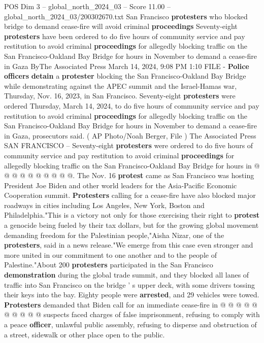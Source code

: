 \begin{textsample}{POS Dim 3 – global\_north\_2024\_03 – Score 11.00 – global\_north\_2024\_03/200302670.txt}  \label{ex:f3_pos_292}
San Francisco \textbf{protesters} who blocked bridge to demand cease-fire will avoid criminal \textbf{proceedings} Seventy-eight \textbf{protesters} have been ordered to do five hours of community service and pay restitution to avoid criminal \textbf{proceedings} for allegedly blocking traffic on the San Francisco-Oakland Bay Bridge for hours in November to demand a cease-fire in Gaza ByThe Associated Press March 14, 2024, 9:08 PM 1:10 FILE - \textbf{Police} \textbf{officers} \textbf{detain} a \textbf{protester} blocking the San Francisco-Oakland Bay Bridge while demonstrating against the APEC summit and the Israel-Hamas war, Thursday, Nov. 16, 2023, in San Francisco.
Seventy-eight \textbf{protesters} were ordered Thursday, March 14, 2024, to do five hours of community service and pay restitution to avoid criminal \textbf{proceedings} for allegedly blocking traffic on the San Francisco-Oakland Bay Bridge for hours in November to demand a cease-fire in Gaza, prosecutors said. ( AP Photo/Noah Berger, File ) The Associated Press SAN FRANCISCO -- Seventy-eight \textbf{protesters} were ordered to do five hours of community service and pay restitution to avoid criminal \textbf{proceedings} for allegedly blocking traffic on the San Francisco-Oakland Bay Bridge for hours in @ @ @ @ @ @ @ @ @ @.
The Nov. 16 \textbf{protest} came as San Francisco was hosting President Joe Biden and other world leaders for the Asia-Pacific Economic Cooperation summit. \textbf{Protesters} calling for a cease-fire have also blocked major roadways in cities including Los Angeles, New York, Boston and Philadelphia."This is a victory not only for those exercising their right to \textbf{protest} a genocide being fueled by their tax dollars, but for the growing global movement demanding freedom for the Palestinian people,"Aisha Nizar, one of the \textbf{protesters}, said in a news release."We emerge from this case even stronger and more united in our commitment to one another and to the people of Palestine."About 200 \textbf{protesters} participated in the San Francisco \textbf{demonstration} during the global trade summit, and they blocked all lanes of traffic into San Francisco on the bridge ' s upper deck, with some drivers tossing their keys into the bay.
Eighty people were \textbf{arrested}, and 29 vehicles were towed. \textbf{Protesters} demanded that Biden call for an immediate cease-fire in @ @ @ @ @ @ @ @ @ @ suspects faced charges of false imprisonment, refusing to comply with a peace \textbf{officer}, unlawful public assembly, refusing to disperse and obstruction of a street, sidewalk or other place open to the public.

\end{textsample}
